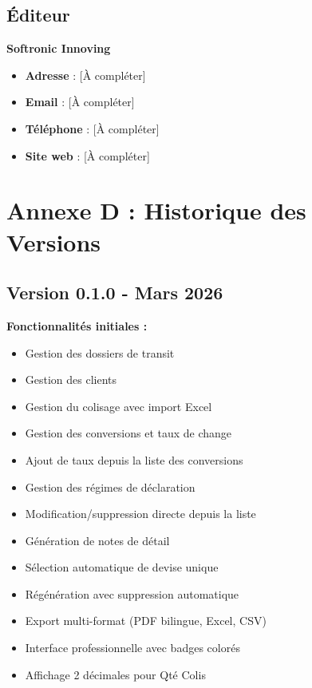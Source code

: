 \documentclass[12pt,a4paper]{report}
\begin{document}
\section{Éditeur}

\textbf{Softronic Innoving}

\begin{itemize}[leftmargin=*]
    \item \textbf{Adresse} : [À compléter]
    \item \textbf{Email} : [À compléter]
    \item \textbf{Téléphone} : [À compléter]
    \item \textbf{Site web} : [À compléter]
\end{itemize}

\chapter{Annexe D : Historique des Versions}

\section{Version 0.1.0 - Mars 2026}

\textbf{Fonctionnalités initiales :}

\begin{itemize}[leftmargin=*]
    \item Gestion des dossiers de transit
    \item Gestion des clients
    \item Gestion du colisage avec import Excel
    \item Gestion des conversions et taux de change
    \item Ajout de taux depuis la liste des conversions
    \item Gestion des régimes de déclaration
    \item Modification/suppression directe depuis la liste
    \item Génération de notes de détail
    \item Sélection automatique de devise unique
    \item Régénération avec suppression automatique
    \item Export multi-format (PDF bilingue, Excel, CSV)
    \item Interface professionnelle avec badges colorés
    \item Affichage 2 décimales pour Qté Colis
\end{itemize}
\end{document}
